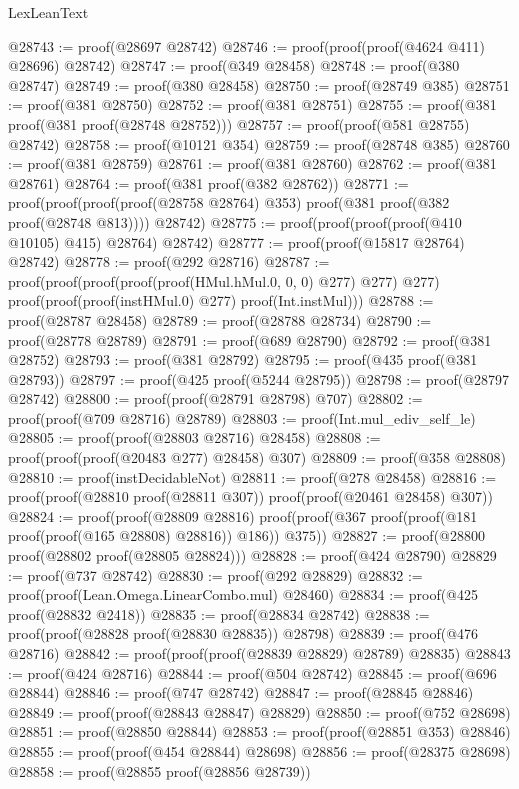 \begin{lexlean}{LexLeanText}
\begin{coremodule}
@28743 := proof(@28697 @28742)
@28746 := proof(proof(proof(@4624 @411) @28696) @28742)
@28747 := proof(@349 @28458)
@28748 := proof(@380 @28747)
@28749 := proof(@380 @28458)
@28750 := proof(@28749 @385)
@28751 := proof(@381 @28750)
@28752 := proof(@381 @28751)
@28755 := proof(@381 proof(@381 proof(@28748 @28752)))
@28757 := proof(proof(@581 @28755) @28742)
@28758 := proof(@10121 @354)
@28759 := proof(@28748 @385)
@28760 := proof(@381 @28759)
@28761 := proof(@381 @28760)
@28762 := proof(@381 @28761)
@28764 := proof(@381 proof(@382 @28762))
@28771 := proof(proof(proof(proof(@28758 @28764) @353) proof(@381 proof(@382 proof(@28748 @813))))
      @28742)
@28775 := proof(proof(proof(proof(@410 @10105) @415) @28764) @28742)
@28777 := proof(proof(@15817 @28764) @28742)
@28778 := proof(@292 @28716)
@28787 := proof(proof(proof(proof(proof(HMul.hMul.{0, 0, 0}) @277) @277) @277)
      proof(proof(proof(instHMul.{0}) @277) proof(Int.instMul)))
@28788 := proof(@28787 @28458)
@28789 := proof(@28788 @28734)
@28790 := proof(@28778 @28789)
@28791 := proof(@689 @28790)
@28792 := proof(@381 @28752)
@28793 := proof(@381 @28792)
@28795 := proof(@435 proof(@381 @28793))
@28797 := proof(@425 proof(@5244 @28795))
@28798 := proof(@28797 @28742)
@28800 := proof(proof(@28791 @28798) @707)
@28802 := proof(proof(@709 @28716) @28789)
@28803 := proof(Int.mul_ediv_self_le)
@28805 := proof(proof(@28803 @28716) @28458)
@28808 := proof(proof(proof(@20483 @277) @28458) @307)
@28809 := proof(@358 @28808)
@28810 := proof(instDecidableNot)
@28811 := proof(@278 @28458)
@28816 := proof(proof(@28810 proof(@28811 @307)) proof(proof(@20461 @28458) @307))
@28824 := proof(proof(@28809 @28816)
      proof(proof(@367 proof(proof(@181 proof(proof(@165 @28808) @28816)) @186)) @375))
@28827 := proof(@28800 proof(@28802 proof(@28805 @28824)))
@28828 := proof(@424 @28790)
@28829 := proof(@737 @28742)
@28830 := proof(@292 @28829)
@28832 := proof(proof(Lean.Omega.LinearCombo.mul) @28460)
@28834 := proof(@425 proof(@28832 @2418))
@28835 := proof(@28834 @28742)
@28838 := proof(proof(@28828 proof(@28830 @28835)) @28798)
@28839 := proof(@476 @28716)
@28842 := proof(proof(proof(@28839 @28829) @28789) @28835)
@28843 := proof(@424 @28716)
@28844 := proof(@504 @28742)
@28845 := proof(@696 @28844)
@28846 := proof(@747 @28742)
@28847 := proof(@28845 @28846)
@28849 := proof(proof(@28843 @28847) @28829)
@28850 := proof(@752 @28698)
@28851 := proof(@28850 @28844)
@28853 := proof(proof(@28851 @353) @28846)
@28855 := proof(proof(@454 @28844) @28698)
@28856 := proof(@28375 @28698)
@28858 := proof(@28855 proof(@28856 @28739))

\end{coremodule}
\end{lexlean}
